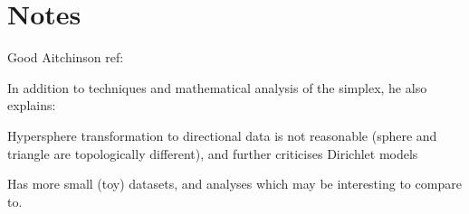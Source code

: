 \section{Notes}

Good Aitchinson ref:


In addition to techniques and mathematical analysis of the simplex, he also explains:

Hypersphere transformation to directional data is not reasonable (sphere and triangle are topologically different), and further criticises Dirichlet models 

Has more small (toy) datasets, and analyses which may be interesting to compare to. 
